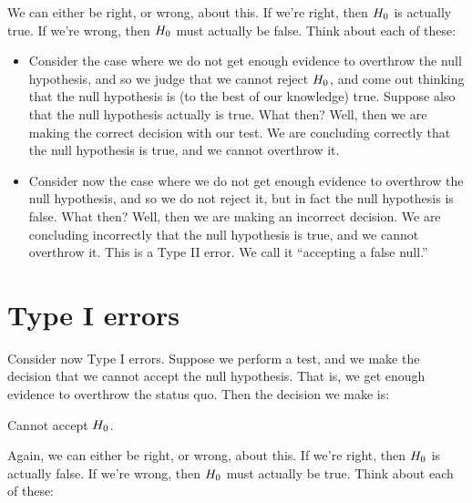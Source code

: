 \documentclass[../../../main.tex]{subfiles}
\begin{document}
\noindent
We can either be right, or wrong, about this. If we're right, then $\NullHyp/$ is actually true. If we're wrong, then $\NullHyp/$ must actually be false. Think about each of these:

\begin{itemize}

  \item Consider the case where we do not get enough evidence to overthrow the null hypothesis, and so we judge that we cannot reject $\NullHyp/$, and come out thinking that the null hypothesis is (to the best of our knowledge) true. Suppose also that the null hypothesis actually is true. What then? Well, then we are making the correct decision with our test. We are concluding correctly that the null hypothesis is true, and we cannot overthrow it.

  \item Consider now the case where we do not get enough evidence to overthrow the null hypothesis, and so we do not reject it, but in fact the null hypothesis is false. What then? Well, then we are making an incorrect decision. We are concluding incorrectly that the null hypothesis is true, and we cannot overthrow it. This is a Type II error. We call it ``accepting a false null.''

\end{itemize}


\section{Type I errors}

Consider now Type I errors. Suppose we perform a test, and we make the decision that we cannot accept the null hypothesis. That is, we get enough evidence to overthrow the status quo. Then the decision we make is:

\begin{center}
  Cannot accept $\NullHyp/$.
\end{center}

\noindent
Again, we can either be right, or wrong, about this. If we're right, then $\NullHyp/$ is actually false. If we're wrong, then $\NullHyp/$ must actually be true. Think about each of these:
\end{document}
